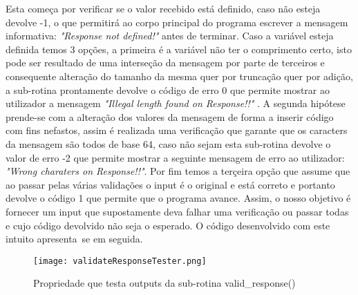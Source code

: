 \par Esta começa por verificar se o valor recebido está definido, caso não esteja devolve -1, o que permitirá ao corpo principal do programa escrever a mensagem informativa: \textit{"Response not defined!"} antes de terminar. Caso a variável esteja definida temos 3 opções, a primeira é a variável não ter o comprimento certo, isto pode ser resultado de uma interseção da mensagem por parte de terceiros e consequente alteração do tamanho da mesma quer por truncação quer por adição, a sub-rotina prontamente devolve o código de erro 0 que permite mostrar ao utilizador a mensagem \textit{"Illegal length found on Response!!"} . A segunda hipótese prende-se com a alteração dos valores da mensagem de forma a inserir código com fins nefastos, assim é realizada uma verificação que garante que os caracters da mensagem são todos de base 64, caso não sejam esta sub-rotina devolve o valor de erro -2 que permite mostrar a seguinte mensagem de erro ao utilizador: \textit{"Wrong charaters on Response!!"}. Por fim temos a terçeira opção que assume que ao passar pelas várias validações o input é o original e está correto e portanto devolve o código 1 que permite que o programa avance. Assim, o nosso objetivo é fornecer um input que supostamente deva falhar uma verificação ou passar todas e cujo código devolvido não seja o esperado. O código desenvolvido com este intuito apresenta~se em seguida.


\begin{figure}[H]

  \centering
  \captionsetup{justification=centering}

  \texttt{[image: validateResponseTester.png]}
  
  \caption {Propriedade que testa outputs da sub-rotina valid\_response()}

\end{figure}

